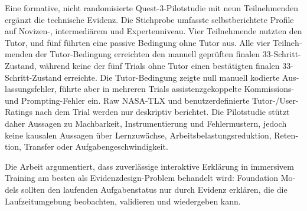 \begin{otherlanguage}{ngerman}
Eine formative, nicht randomisierte Quest-3-Pilotstudie mit neun Teilnehmenden
erg\"anzt die technische Evidenz. Die Stichprobe umfasste selbstberichtete
Profile auf Novizen-, intermedi\"arem und Expertenniveau. Vier Teilnehmende
nutzten den Tutor, und f\"unf f\"uhrten eine passive Bedingung ohne Tutor aus.
Alle vier Teilnehmenden der Tutor-Bedingung erreichten den manuell gepr\"uften
finalen 33-Schritt-Zustand, w\"ahrend keine der f\"unf Trials ohne Tutor einen
best\"atigten finalen 33-Schritt-Zustand erreichte. Die Tutor-Bedingung zeigte
null manuell kodierte Auslassungsfehler, f\"uhrte aber in mehreren Trials
assistenzgekoppelte Kommissions- und Prompting-Fehler ein. Raw NASA-TLX und
benutzerdefinierte Tutor-/User-Ratings nach dem Trial werden nur deskriptiv
berichtet. Die Pilotstudie st\"utzt daher Aussagen zu Machbarkeit,
Instrumentierung und Fehlermustern, jedoch keine kausalen Aussagen \"uber
Lernzuw\"achse, Arbeitsbelastungsreduktion, Retention, Transfer oder
Aufgabengeschwindigkeit.

Die Arbeit argumentiert, dass zuverl\"assige interaktive Erkl\"arung in
immersivem Training am besten als Evidenzdesign-Problem behandelt wird:
Foundation Models sollten den laufenden Aufgabenstatus nur durch Evidenz
erkl\"aren, die die Laufzeitumgebung beobachten, validieren und wiedergeben
kann.
\end{otherlanguage}
